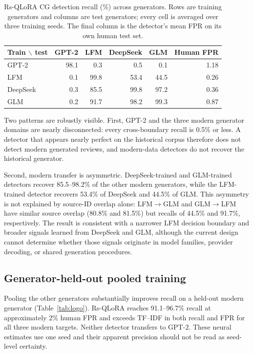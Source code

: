 \documentclass[utf8]{FrontiersinHarvard}
\begin{document}
\begin{table}[h!]
\centering
\caption{Rs-QLoRA CG detection recall (\%) across generators. Rows are training generators and columns are test generators; every cell is averaged over three training seeds. The final column is the detector's mean FPR on its own human test set.}
\label{tab:matrix}
\begin{tabular}{lrrrrr}
\toprule
Train $\backslash$ test & GPT-2 & LFM & DeepSeek & GLM & Human FPR \\
\midrule
GPT-2 & 98.1 & 0.3 & 0.5 & 0.1 & 1.18 \\
LFM & 0.1 & 99.8 & 53.4 & 44.5 & 0.26 \\
DeepSeek & 0.3 & 85.5 & 99.8 & 97.2 & 0.36 \\
GLM & 0.2 & 91.7 & 98.2 & 99.3 & 0.87 \\
\bottomrule
\end{tabular}
\end{table}

Two patterns are robustly visible. First, GPT-2 and the three modern generator domains are nearly disconnected: every cross-boundary recall is 0.5\% or less. A detector that appears nearly perfect on the historical corpus therefore does not detect modern generated reviews, and modern-data detectors do not recover the historical generator.

Second, modern transfer is asymmetric. DeepSeek-trained and GLM-trained detectors recover 85.5--98.2\% of the other modern generators, while the LFM-trained detector recovers 53.4\% of DeepSeek and 44.5\% of GLM. This asymmetry is not explained by source-ID overlap alone: LFM$\rightarrow$GLM and GLM$\rightarrow$LFM have similar source overlap (80.8\% and 81.5\%) but recalls of 44.5\% and 91.7\%, respectively. The result is consistent with a narrower LFM decision boundary and broader signals learned from DeepSeek and GLM, although the current design cannot determine whether those signals originate in model families, provider decoding, or shared generation procedures.

\subsection{Generator-held-out pooled training}

Pooling the other generators substantially improves recall on a held-out modern generator (Table~\ref{tab:logo}). Rs-QLoRA reaches 91.1--96.7\% recall at approximately 2\% human FPR and exceeds TF--IDF in both recall and FPR for all three modern targets. Neither detector transfers to GPT-2. These neural estimates use one seed and their apparent precision should not be read as seed-level certainty.
\end{document}
